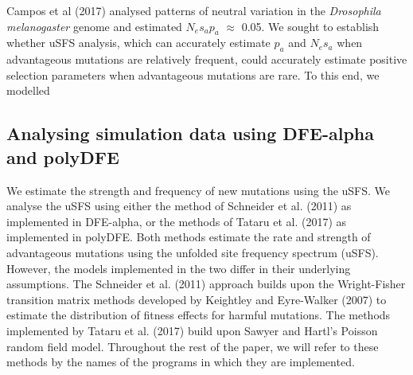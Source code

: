 \documentclass[11pt]{article}
\begin{document}
	Campos et al (2017) analysed patterns of neutral variation in the \textit{Drosophila melanogaster} genome and estimated $N_es_ap_a$ $\approx$ 0.05. We sought to establish whether uSFS analysis, which can accurately estimate $p_a$ and $N_es_a$ when advantageous mutations are relatively frequent, could accurately estimate positive selection parameters when advantageous mutations are rare. To this end, we modelled 


%

	\subsection*{Analysing simulation data using DFE-alpha and polyDFE}

	We estimate the strength and frequency of new mutations using the uSFS. We analyse the uSFS using either the method of Schneider et al. (2011) as implemented in DFE-alpha, or the methods of Tataru et al. (2017) as implemented in polyDFE. Both methods estimate the rate and strength of advantageous mutations using the unfolded site frequency spectrum (uSFS). However, the models implemented in the two differ in their underlying assumptions. The Schneider et al. (2011) approach builds upon the Wright-Fisher transition matrix methods developed by Keightley and Eyre-Walker (2007) to estimate the distribution of fitness effects for harmful mutations. The methods implemented by Tataru et al. (2017) build upon Sawyer and Hartl’s Poisson random field model.
Throughout the rest of the paper, we will refer to these methods by the names of the programs in which they are implemented.
\end{document}
